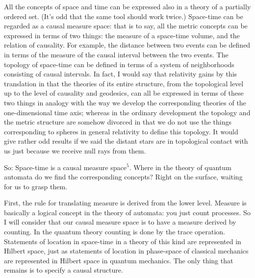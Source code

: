 All the concepts of space and time can be expressed also in a theory of a
partially ordered set. (It's odd that the same tool should work twice.)
Space-time can be regarded as a causal measure space: that is to say, all the
metric concepts can be expressed in terms of two things: the measure of a
space-time volume, and the relation of causality. For example, the distance
between two events can be defined in terms of the measure of the causal interval
between the two events. The topology of space-time can be defined in terms of a
system of neighborhoods consisting of causal intervals. In fact, I would say that
relativity gains by this translation in that the theories of its entire
structure, from the topological level up to the level of causality and geodesics,
can all be expressed in terms of these two things in analogy with the way we
develop the corresponding theories of the one-dimensional time axis; whereas in
the ordinary development the topology and the metric structure are somehow
divorced in that we do not use the things corresponding to spheres in general
relativity to define this topology. It would give rather odd results if we said
the distant stars are in topological contact with us just because we receive
null rays from them.

So: Space-time is a causal measure space$^5$. Where in the theory of quantum automata
do we find the corresponding concepts? Right on the surface, waiting for us to
grasp them.

First, the rule for translating measure is derived from the lower level. Measure
is basically a logical concept in the theory of automata: you just count
processes. So I will consider that our causal measure space is to have a measure
derived by counting. In the quantum theory counting is done by the trace
operation. Statements of location in space-time in a theory of this kind are
represented in Hilbert space, just as statements of location in phase-space of
classical mechanics are represented in Hilbert space in quantum mechanics. The
only thing that remains is to specify a causal structure.

